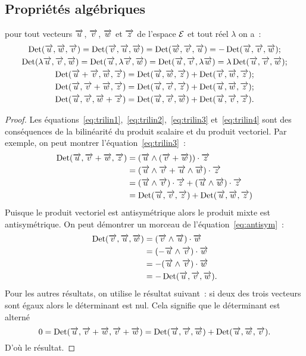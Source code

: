 \subsection{Propriétés algébriques}
\begin{prop}
  pour tout vecteurs \(\vu\), \(\vv\), \(\vw\) et \( \vz\) de l'espace \(\E\)
  et tout réel \(\lambda\) on a~:
  \begin{gather}
    \Det(\vu, \vw, \vv) = \Det(\vv, \vu, \vw) = \Det(\vw, \vv, \vu) =
    -\Det(\vu, \vv, \vw) \label{eq:antisym};\\
    \Det(\lambda\vu, \vv, \vw) = \Det(\vu, \lambda\vv, \vw) = \Det(\vu, \vv,
    \lambda\vw) = \lambda\Det(\vu, \vv, \vw)\label{eq:trilin1};\\
    \Det(\vu + \vv, \vw, \vz) = \Det(\vu, \vw, \vz) + \Det(\vv, \vw, \vz)
    \label{eq:trilin2};\\
    \Det(\vu, \vv + \vw, \vz) = \Det(\vu, \vv, \vz) + \Det(\vu, \vw, \vz)
    \label{eq:trilin3};\\
    \Det(\vu, \vv, \vw + \vz) = \Det(\vu, \vv, \vw) + \Det(\vu, \vv, \vz)
    \label{eq:trilin4}.
  \end{gather}
\end{prop}

\begin{proof}
  Les équations~\eqref{eq:trilin1},~\eqref{eq:trilin2},~\eqref{eq:trilin3}
  et~\eqref{eq:trilin4} sont des conséquences de la bilinéarité du produit
  scalaire et du produit vectoriel. Par exemple, on peut montrer
  l'équation~\eqref{eq:trilin3}~:
  \begin{align}
    \Det(\vu, \vv + \vw, \vz)
    & = (\vu\wedge(\vv + \vw))\cdot\vz\\
    & = (\vu\wedge\vv + \vu\wedge\vw)\cdot\vz\\
    & = (\vu\wedge\vv)\cdot\vz + (\vu\wedge\vw)\cdot\vz\\
    & = \Det(\vu, \vv, \vz) + \Det(\vu, \vw, \vz)
  \end{align}
  Puisque le produit vectoriel est antisymétrique alors le produit mixte est
  antisymétrique. On peut démontrer un morceau de
  l'équation~\eqref{eq:antisym}~:
  \begin{align}
    \Det(\vv, \vu, \vw)& =(\vv\wedge\vu)\cdot\vw\\
                       & =(-\vu\wedge\vv)\cdot\vw\\
                       & =-(\vu\wedge\vv)\cdot\vw\\
                       & =-\Det(\vu, \vv, \vw).
  \end{align}
  Pour les autres résultats, on utilise le résultat suivant~: si deux des
  trois vecteurs sont égaux alors le déterminant est nul. Cela signifie que le
  déterminant est alterné
  \begin{equation}
    0 = \Det(\vu, \vv + \vw, \vv + \vw) = \Det(\vu, \vv, \vw) + \Det(\vu, \vw,
    \vv).
  \end{equation}
  D'où le résultat.
\end{proof}

